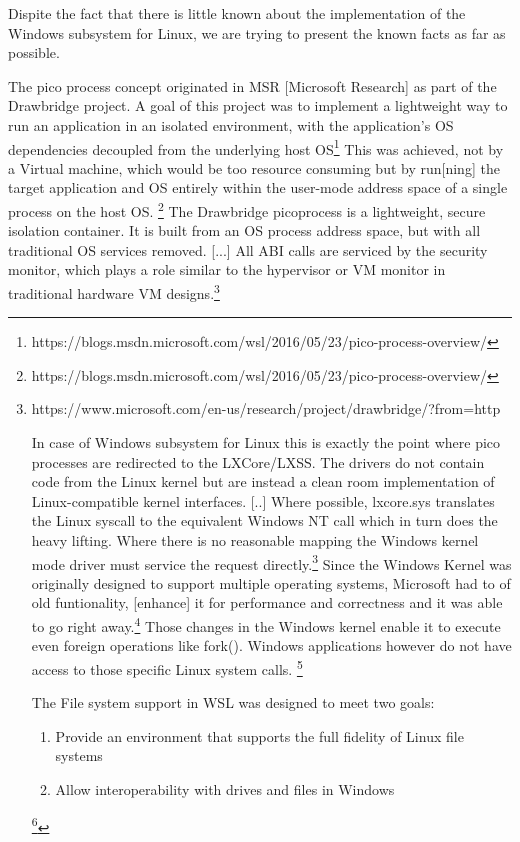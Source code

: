 \documentclass[utf8,biblatex]{lni}
\begin{document}
Dispite the fact that there is little known about the implementation of the Windows subsystem for Linux, we are trying to present the known facts as far as possible.

\glqq The pico process concept originated in MSR [Microsoft Research] as part of the Drawbridge project. A goal of this project was to implement a lightweight way to run an application in an isolated environment, with the application’s OS dependencies decoupled from the underlying host OS\glqq \footnote{https://blogs.msdn.microsoft.com/wsl/2016/05/23/pico-process-overview/} This was achieved, not by a Virtual machine, which would be too resource consuming but by \glqq run[ning] the target application and OS entirely within the user-mode address space of a single process on the host OS. \glqq \footnote{https://blogs.msdn.microsoft.com/wsl/2016/05/23/pico-process-overview/} \glqq The Drawbridge picoprocess is a lightweight, secure isolation container. It is built from an OS process address space, but with all traditional OS services removed. [...] All ABI calls are serviced by the security monitor, which plays a role similar to the hypervisor or VM monitor in traditional hardware VM designs.\glqq \footnote{https://www.microsoft.com/en-us/research/project/drawbridge/?from=http%

In case of Windows subsystem for Linux this is exactly the point where pico processes are redirected to the LXCore/LXSS. \glqq The drivers do not contain code from the Linux kernel but are instead a clean room implementation of Linux-compatible kernel interfaces. [..] Where possible, lxcore.sys translates the Linux syscall to the equivalent Windows NT call which in turn does the heavy lifting. Where there is no reasonable mapping the Windows kernel mode driver must service the request directly.\glqq \footnote{} Since the Windows Kernel was originally designed to support multiple operating systems, Microsoft had to \glqq [dust] [...] of old funtionality, [enhance] it for performance and correctness and it was able to go right away.\glqq \footnote{https://blogs.msdn.microsoft.com/wsl/2016/05/23/pico-process-overview/} Those changes in the Windows kernel enable it to execute even foreign operations like fork(). Windows applications however do not have access to those specific Linux system calls. \footnote{}

\glqq The File system support in WSL was designed to meet two goals:
\begin{enumerate}
    \item Provide an environment that supports the full fidelity of Linux file systems
    \item Allow interoperability with drives and files in Windows
\end{enumerate}\footnote{https://blogs.msdn.microsoft.com/wsl/2016/04/22/windows-subsystem-for-linux-overview/}

}
\end{document}
